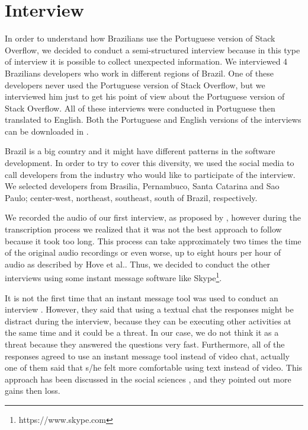 \section{Interview}
\noindent In order to understand how Brazilians use the Portuguese version of Stack Overflow, we decided to conduct a semi-structured interview because in this type of interview it is possible to collect unexpected information. We interviewed 4 Brazilians developers who work in different regions of Brazil. One of these developers never used the Portuguese version of Stack Overflow, but we interviewed him just to get his point of view about the Portuguese version of Stack Overflow. All of these interviews were conducted in Portuguese then translated to English. Both the Portuguese and English versions of the interviews can be downloaded in .

Brazil is a big country and it might have different patterns in the software development. In order to try to cover this diversity, we used the social media to call developers from the industry who would like to participate of the interview. We selected developers from Brasilia, Pernambuco, Santa Catarina and Sao Paulo; center-west, northeast, southeast, south of Brazil, respectively.

We recorded the audio of our first interview, as proposed by \cite{Seaman:1999}, however during the transcription process we realized that it was not the best approach to follow because it took too long. This process can take approximately two times the time of the original audio recordings\cite{Gerpheide:2016} or even worse, up to eight hours per hour of audio as described by Hove et al.\cite{Hove:2005}. Thus, we decided to conduct the other interviews using some instant message software like Skype\footnote{https://www.skype.com}. 

It is not the first time that an instant message tool was used to conduct an interview \cite{IgorPhdThesis}. However, they said that using a textual chat the responses might be distract during the interview, because they can be executing other activities at the same time and it could be a threat. In our case, we do not think it as a threat because they answered the questions very fast. Furthermore, all of the responses agreed to use an instant message tool instead of video chat, actually one of them said that s/he felt more comfortable using text instead of video. This approach has been discussed in the social sciences \cite{citeulike:2009, FQS175}, and they pointed out more gains then loss.



